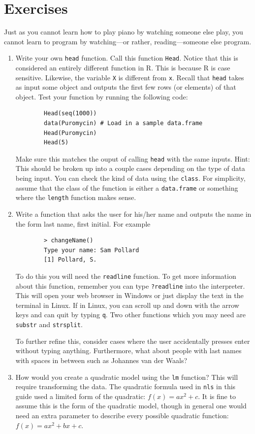 \documentclass[12pt]{article}
\theoremstyle{remark}
\begin{document}
\newpage
\part{Exercises}

Just as you cannot learn how to play piano by watching someone else play, you cannot learn to program by watching---or rather, reading---someone else program.

\begin{enumerate}
	\item { Write your own \verb|head| function. Call this function \verb|Head|. Notice that this is considered an entirely different function in R. This is because R is case sensitive. Likewise, the variable \verb|X| is different from \verb|x|. Recall that \verb|head| takes as input some object and outputs the first few rows (or elements) of that object. Test your function by running the following code:
	\begin{verbatim}
		Head(seq(1000))
		data(Puromycin) # Load in a sample data.frame
		Head(Puromycin)
		Head(5)
	\end{verbatim}
	Make sure this matches the ouput of calling \verb|head| with the same inputs. Hint: This should be broken up into a couple cases depending on the type of data being input. You can check the kind of data using the \verb|class|. For simplicity, assume that the class of the function is either a \verb|data.frame| or something where the \verb|length| function makes sense.
	}
	
	\item { Write a function that asks the user for his/her name and outputs the name in the form last name, first initial. For example
	\begin{verbatim}
		> changeName()
		Type your name: Sam Pollard
		[1] Pollard, S.
	\end{verbatim}
	
	To do this you will need the \verb|readline| function. To get more information about this function, remember you can type \verb|?readline| into the interpreter. This will open your web browser in Windows or just display the text in the terminal in Linux. If in Linux, you can scroll up and down with the arrow keys and can quit by typing \verb|q|. Two other functions which you may need are \verb|substr| and \verb|strsplit|.
	
	To further refine this, consider cases where the user accidentally presses enter without typing anything. Furthermore, what about people with last names with spaces in between such as Johannes van der Waals?
	}
	
	\item { How would you create a quadratic model using the \verb|lm| function? This will require transforming the data. The quadratic formula used in \verb|nls| in this guide used a limited form of the quadratic: $f(x) = ax^2 + c$. It is fine to assume this is the form of the quadratic model, though in general one would need an extra parameter to describe every possible quadratic function: $f(x) = ax^2 + bx + c$.
	}

\end{enumerate}
\end{document}
